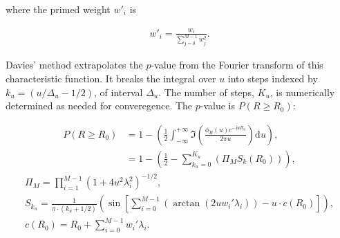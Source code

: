 \documentclass[12pt]{iopart}
\begin{document}
\noindent where the primed weight $w'_i$ is

\begin{eqnarray}
w'_i = \frac{w_i}{\sum\limits_{j=0}^{M-1} w_j^2}.
\end{eqnarray}

\noindent Davies' method extrapolates the $p$-value from the Fourier transform of this characteristic function.
It breaks the integral over $u$ into steps indexed by $k_u = (u/\Delta_u - 1/2)$, of interval $\Delta_u$.
The number of steps, $K_u$, is numerically determined as needed for converegence.
The $p$-value is $P (R \geq R_0)$:

\begin{eqnarray}
P(R \geq R_0) &= 1 - \left(\frac{1}{2} \int_{-\infty}^{+\infty} \Im \left(\frac{\phi_R(u)e^{-\mathrm{i} u R_0}}{2 \pi u} \right) \mathrm{d}u \right),\\
  &= 1 - \left(\frac{1}{2} - \sum\limits_{k_u = 0}^{K_u} (\Pi_M S_k(R_0)) \right),
\end{eqnarray}
\begin{eqnarray}
\Pi_M = \prod\limits_{i=1}^{M-1} (1 + 4 u^2 \lambda_i^2)^{-1/2},\\
S_{k_u}  = \frac{1}{\pi \cdot (k_u+1/2)}\left(\sin \left[\sum_{i=0}^{M-1} \left( \arctan{(2 u w_i' \lambda_i)} \right) - u \cdot c(R_0)\right] \right),\\
c(R_0) =  R_0 + \sum\limits_{i=0}^{M-1} w_i' \lambda_i.
\end{eqnarray}

% 
%
% 
% 
\end{document}
